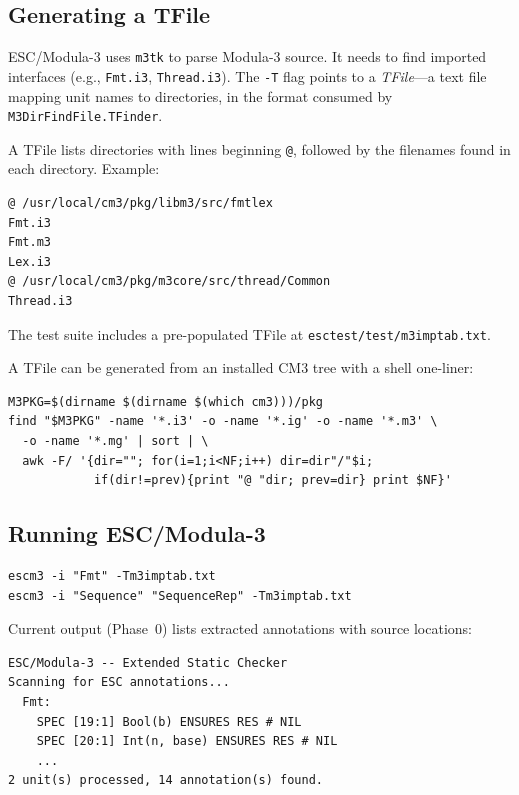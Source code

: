 \documentclass[11pt]{article}
\newcommand{\escm}{ESC/Modula-3}
\newcommand{\m}[1]{\texttt{#1}}
\begin{document}
\subsection{Generating a TFile}
\label{sec:tfile}

\escm{} uses \m{m3tk} to parse Modula-3 source.  It needs to find
imported interfaces (e.g., \m{Fmt.i3}, \m{Thread.i3}).  The \m{-T}
flag points to a \emph{TFile}---a text file mapping unit names to
directories, in the format consumed by \m{M3DirFindFile.TFinder}.

A TFile lists directories with lines beginning \m{@}, followed by
the filenames found in each directory.  Example:

\begin{lstlisting}[language={}]
@ /usr/local/cm3/pkg/libm3/src/fmtlex
Fmt.i3
Fmt.m3
Lex.i3
@ /usr/local/cm3/pkg/m3core/src/thread/Common
Thread.i3
\end{lstlisting}

The test suite includes a pre-populated TFile at
\m{esctest/test/m3imptab.txt}.

A TFile can be generated from an installed CM3 tree with a shell
one-liner:

\begin{lstlisting}[language={}]
M3PKG=$(dirname $(dirname $(which cm3)))/pkg
find "$M3PKG" -name '*.i3' -o -name '*.ig' -o -name '*.m3' \
  -o -name '*.mg' | sort | \
  awk -F/ '{dir=""; for(i=1;i<NF;i++) dir=dir"/"$i;
            if(dir!=prev){print "@ "dir; prev=dir} print $NF}'
\end{lstlisting}

\subsection{Running \escm{}}

\begin{lstlisting}[language={}]
escm3 -i "Fmt" -Tm3imptab.txt
escm3 -i "Sequence" "SequenceRep" -Tm3imptab.txt
\end{lstlisting}

Current output (Phase~0) lists extracted annotations with source
locations:

\begin{lstlisting}[language={}]
ESC/Modula-3 -- Extended Static Checker
Scanning for ESC annotations...
  Fmt:
    SPEC [19:1] Bool(b) ENSURES RES # NIL
    SPEC [20:1] Int(n, base) ENSURES RES # NIL
    ...
2 unit(s) processed, 14 annotation(s) found.
\end{lstlisting}
\end{document}
